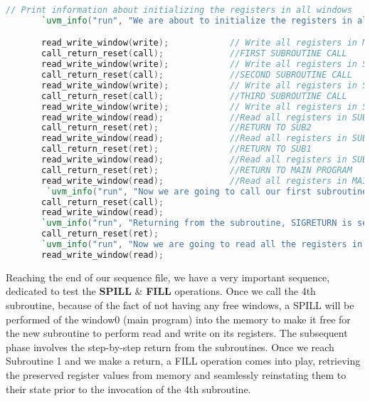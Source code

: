 \documentclass[12pt,a4paper]{report}
\begin{document}
\begin{lstlisting}[language=Verilog, caption= First Sequence, label=lst:sysverilog]
       // Print information about initializing the registers in all windows
       `uvm_info("run", "We are about to initialize the registers in all the windows", UVM_MEDIUM);  

       read_write_window(write);            // Write all registers in Main window
       call_return_reset(call);             //FIRST SUBROUTINE CALL
       read_write_window(write);            // Write all registers in SUB1
       call_return_reset(call);             //SECOND SUBROUTINE CALL
       read_write_window(write);            // Write all registers in SUB2         
       call_return_reset(call);             //THIRD SUBROUTINE CALL 
       read_write_window(write);            // Write all registers in SUB3
       read_write_window(read);             //Read all registers in SUB3
       call_return_reset(ret);              //RETURN TO SUB2
       read_write_window(read);             //Read all registers in SUB2
       call_return_reset(ret);              //RETURN TO SUB1
       read_write_window(read);             //Read all registers in SUB1
       call_return_reset(ret);              //RETURN TO MAIN PROGRAM
       read_write_window(read);             //Read all registers in MAIN PROGRAM
        `uvm_info("run", "Now we are going to call our first subroutine and read all the registers in the window", UVM_MEDIUM);
       call_return_reset(call);
       read_write_window(read); 
       `uvm_info("run", "Returning from the subroutine, SIGRETURN is set", UVM_MEDIUM);
       call_return_reset(ret);
       `uvm_info("run", "Now we are going to read all the registers in the current window", UVM_MEDIUM); 
       read_write_window(read);
\end{lstlisting}
\vspace{0.7cm}
Reaching the end of our sequence file, we have a very important sequence, dedicated to test the \textbf{SPILL} \& \textbf{FILL} operations. Once we call the 4th subroutine, because of the fact of not having any free windows, a SPILL will be performed of the window0 (main program) into the memory to make it free for the new subroutine to perform read and write on its registers. The subsequent phase involves the step-by-step return from the subroutines. Once we reach Subroutine 1 and we make a return, a FILL operation comes into play, retrieving the preserved register values from memory and seamlessly reinstating them to their state prior to the invocation of the 4th subroutine.
\end{document}
